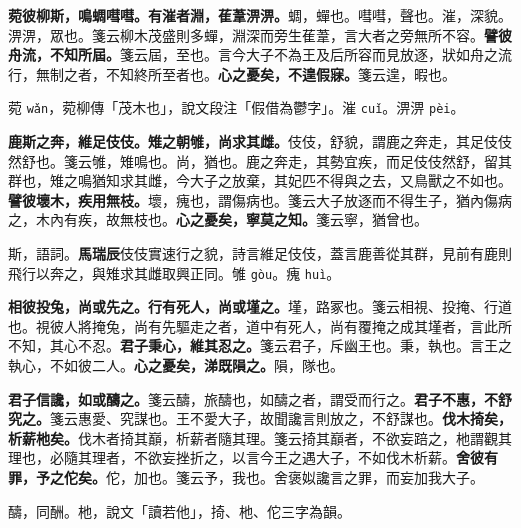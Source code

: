 \textbf{菀彼柳斯，鳴蜩嘒嘒。有漼者淵，萑葦淠淠。}{\footnotesize 蜩，蟬也。嘒嘒，聲也。漼，深貌。淠淠，眾也。箋云柳木茂盛則多蟬，淵深而旁生萑葦，言大者之旁無所不容。}\textbf{譬彼舟流，不知所屆。}{\footnotesize 箋云屆，至也。言今大子不為王及后所容而見放逐，狀如舟之流行，無制之者，不知終所至者也。}\textbf{心之憂矣，不遑假寐。}{\footnotesize 箋云遑，暇也。}

\begin{quoting}菀 \texttt{wǎn}，菀柳傳「茂木也」，說文段注「假借為鬱字」。漼 \texttt{cuǐ}。淠淠 \texttt{pèi}。\end{quoting}

\textbf{鹿斯之奔，維足伎伎。雉之朝雊，尚求其雌。}{\footnotesize 伎伎，舒貌，謂鹿之奔走，其足伎伎然舒也。箋云雊，雉鳴也。尚，猶也。鹿之奔走，其勢宜疾，而足伎伎然舒，留其群也，雉之鳴猶知求其雌，今大子之放棄，其妃匹不得與之去，又鳥獸之不如也。}\textbf{譬彼壞木，疾用無枝。}{\footnotesize 壞，瘣也，謂傷病也。箋云大子放逐而不得生子，猶內傷病之，木內有疾，故無枝也。}\textbf{心之憂矣，寧莫之知。}{\footnotesize 箋云寧，猶曾也。}

\begin{quoting}斯，語詞。\textbf{馬瑞辰}伎伎實速行之貌，詩言維足伎伎，蓋言鹿善從其群，見前有鹿則飛行以奔之，與雉求其雌取興正同。雊 \texttt{gòu}。瘣 \texttt{huì}。\end{quoting}

\textbf{相彼投兔，尚或先之。行有死人，尚或墐之。}{\footnotesize 墐，路冢也。箋云相視、投掩、行道也。視彼人將掩兔，尚有先驅走之者，道中有死人，尚有覆掩之成其墐者，言此所不知，其心不忍。}\textbf{君子秉心，維其忍之。}{\footnotesize 箋云君子，斥幽王也。秉，執也。言王之執心，不如彼二人。}\textbf{心之憂矣，涕既隕之。}{\footnotesize 隕，隊也。}

\textbf{君子信讒，如或醻之。}{\footnotesize 箋云醻，旅醻也，如醻之者，謂受而行之。}\textbf{君子不惠，不舒究之。}{\footnotesize 箋云惠愛、究謀也。王不愛大子，故聞讒言則放之，不舒謀也。}\textbf{伐木掎矣，析薪杝矣。}{\footnotesize 伐木者掎其巔，析薪者隨其理。箋云掎其巔者，不欲妄踣之，杝謂觀其理也，必隨其理者，不欲妄挫折之，以言今王之遇大子，不如伐木析薪。}\textbf{舍彼有罪，予之佗矣。}{\footnotesize 佗，加也。箋云予，我也。舍褒姒讒言之罪，而妄加我大子。}

\begin{quoting}醻，同酬。杝，說文「讀若他」，掎、杝、佗三字為韻。\end{quoting}

